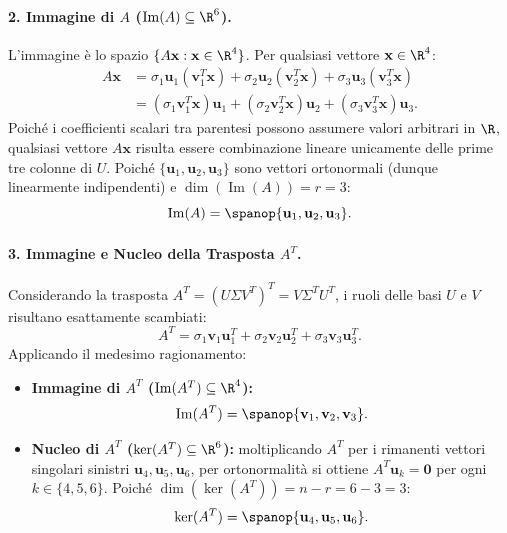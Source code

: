 \paragraph{2. Immagine di $A$ ($\operatorname{Im}(A) \subseteq \R^6$).}
L'immagine \`e lo spazio $\{A\mathbf{x} : \mathbf{x} \in \R^4\}$. Per qualsiasi vettore $\mathbf{x} \in \R^4$:
\begin{align}
    A\mathbf{x} &= \sigma_1 \mathbf{u}_1 (\mathbf{v}_1^T \mathbf{x}) + \sigma_2 \mathbf{u}_2 (\mathbf{v}_2^T \mathbf{x}) + \sigma_3 \mathbf{u}_3 (\mathbf{v}_3^T \mathbf{x}) \nonumber \\
                &= (\sigma_1 \mathbf{v}_1^T \mathbf{x}) \mathbf{u}_1 + (\sigma_2 \mathbf{v}_2^T \mathbf{x}) \mathbf{u}_2 + (\sigma_3 \mathbf{v}_3^T \mathbf{x}) \mathbf{u}_3.
\end{align}
Poich\'e i coefficienti scalari tra parentesi possono assumere valori arbitrari in $\R$, qualsiasi vettore $A\mathbf{x}$ risulta essere combinazione lineare unicamente delle prime tre colonne di $U$. Poich\'e $\{\mathbf{u}_1, \mathbf{u}_2, \mathbf{u}_3\}$ sono vettori ortonormali (dunque linearmente indipendenti) e $\dim(\operatorname{Im}(A)) = r = 3$:
\begin{equation}
    \operatorname{Im}(A) = \spanop\{\mathbf{u}_1, \mathbf{u}_2, \mathbf{u}_3\}.
\end{equation}

\paragraph{3. Immagine e Nucleo della Trasposta $A^T$.}
Considerando la trasposta $A^T = (U \Sigma V^T)^T = V \Sigma^T U^T$, i ruoli delle basi $U$ e $V$ risultano esattamente scambiati:
\begin{equation}
    A^T = \sigma_1 \mathbf{v}_1 \mathbf{u}_1^T + \sigma_2 \mathbf{v}_2 \mathbf{u}_2^T + \sigma_3 \mathbf{v}_3 \mathbf{u}_3^T.
\end{equation}
Applicando il medesimo ragionamento:
\begin{itemize}
    \item \textbf{Immagine di $A^T$ ($\operatorname{Im}(A^T) \subseteq \R^4$):}
    \begin{equation}
        \operatorname{Im}(A^T) = \spanop\{\mathbf{v}_1, \mathbf{v}_2, \mathbf{v}_3\}.
    \end{equation}
    \item \textbf{Nucleo di $A^T$ ($\ker(A^T) \subseteq \R^6$):}
    moltiplicando $A^T$ per i rimanenti vettori singolari sinistri $\mathbf{u}_4, \mathbf{u}_5, \mathbf{u}_6$, per ortonormalit\`a si ottiene $A^T \mathbf{u}_k = \mathbf{0}$ per ogni $k \in \{4, 5, 6\}$. Poich\'e $\dim(\ker(A^T)) = n - r = 6 - 3 = 3$:
    \begin{equation}
        \ker(A^T) = \spanop\{\mathbf{u}_4, \mathbf{u}_5, \mathbf{u}_6\}.
    \end{equation}
\end{itemize}

